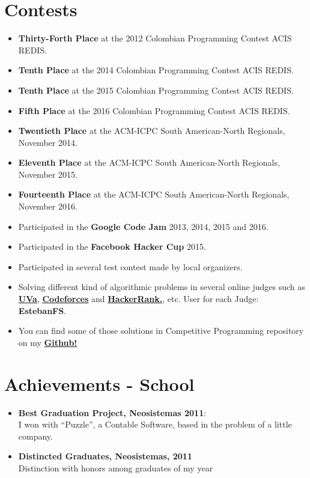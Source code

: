 \documentclass[a4paper,10pt]{article} %
\begin{document}
\section{Contests}
\begin{itemize}
 \item \textbf{Thirty-Forth Place} at the 2012 Colombian Programming Contest ACIS REDIS.
 \item \textbf{Tenth Place} at the 2014 Colombian Programming Contest ACIS REDIS.
 \item \textbf{Tenth Place} at the 2015 Colombian Programming Contest ACIS REDIS.
 \item \textbf{Fifth Place} at the 2016 Colombian Programming Contest ACIS REDIS.
 \item \textbf{Twentieth Place} at the ACM-ICPC South American-North Regionals, November 2014.
 \item \textbf{Eleventh Place} at the ACM-ICPC South American-North Regionals, November 2015.
 \item \textbf{Fourteenth Place} at the ACM-ICPC South American-North Regionals, November 2016.
 \item Participated in the \textbf{Google Code Jam} 2013, 2014, 2015 and 2016.
 \item Participated in the \textbf{Facebook Hacker Cup} 2015.
 \item Participated in several test contest made by local organizers.
 \item Solving different kind of algorithmic problems in several online judges such as
\href{http://uhunt.felix-halim.net/id/152728}{\textbf{UVa}}, \href{http://codeforces.com/profile/EstebanFS}{\textbf{Codeforces}} and \href{https://www.hackerrank.com/EstebanFS}{\textbf{HackerRank.}}, etc.
User for each Judge: \textbf{EstebanFS}.
\item You can find some of those solutions in Competitive Programming repository on my \href{https://github.com/EstebanFS/Competitive-Programming}{\textbf{Github!}}
\end{itemize}


\section{Achievements - School}
\begin{itemize}
\item \textbf{Best Graduation Project, Neosistemas 2011}:\\
I won with ``Puzzle'', a Contable Software, based in the problem of a little company.
\item \textbf{Distincted Graduates, Neosistemas, 2011}\\
Distinction with honors among graduates of my year
\end{itemize}
\end{document}
